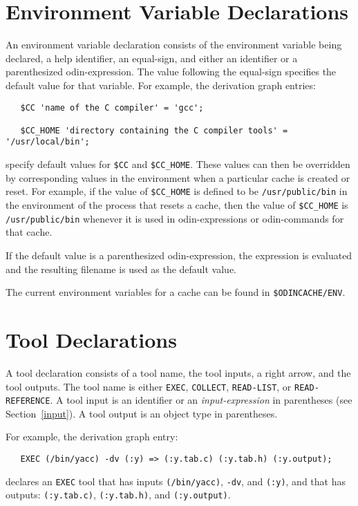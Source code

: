 \documentclass[hidelinks]{report}
\newcommand{\ex}{\tt}   %
\begin{document}
\section{Environment Variable Declarations}
\label{envvardecl}

An environment variable declaration consists of
the environment variable being declared,
a help identifier, an equal-sign, and either an identifier
or a parenthesized odin-expression.
The value following the equal-sign specifies
the default value for that variable.
For example, the derivation graph entries:
\begin{verbatim}
   $CC 'name of the C compiler' = 'gcc';

   $CC_HOME 'directory containing the C compiler tools' = '/usr/local/bin';
\end{verbatim}
specify default values for {\ex \$CC} and {\ex \$CC\_HOME}.
These values can then be overridden by corresponding values in the
environment when a particular cache is created or reset.
For example, if the value of {\ex \$CC\_HOME} is defined to be
{\ex /usr/public/bin} in the environment of the process 
that resets a cache,
then the value of {\ex \$CC\_HOME} is {\ex /usr/public/bin}
whenever it is used in odin-expressions or odin-commands
for that cache.

If the default value is a parenthesized odin-expression,
the expression is evaluated and the resulting filename is used as
the default value.

The current environment variables for a cache can be found
in {\ex \$ODINCACHE/ENV}.


\section{Tool Declarations}
\label{execdecl}

A tool declaration consists of a tool name, the tool inputs,
a right arrow, and the tool outputs.
The tool name is either {\ex EXEC}, {\ex COLLECT}, {\ex READ-LIST},
or {\ex READ-REFERENCE}.
A tool input is an identifier
or an {\em input-expression} in parentheses (see Section~\ref{input}).
A tool output is an object type in parentheses.

For example, the derivation graph entry:
\begin{verbatim}
   EXEC (/bin/yacc) -dv (:y) => (:y.tab.c) (:y.tab.h) (:y.output);
\end{verbatim}
declares an {\ex EXEC} tool that has inputs
{\ex (/bin/yacc)}, {\ex -dv}, and {\ex (:y)},
and that has outputs:
{\ex (:y.tab.c)}, {\ex (:y.tab.h)}, and {\ex (:y.output)}.
\end{document}
